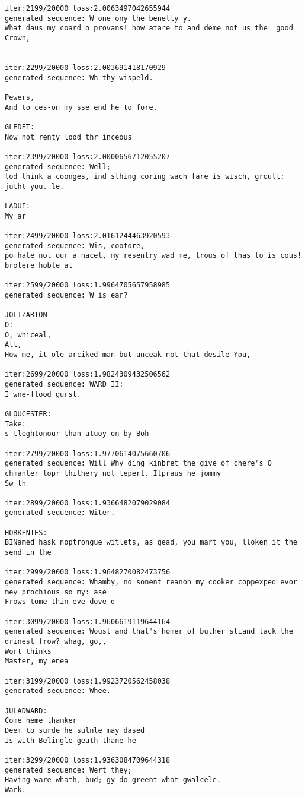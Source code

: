 \documentclass[11pt]{article}
\begin{document}
\begin{Verbatim}[commandchars=\\\{\}]
iter:2199/20000 loss:2.0063497042655944
generated sequence: W one ony the benelly y.
What daus my coard o provans! how atare to and deme not us the 'good
Crown,


iter:2299/20000 loss:2.003691418170929
generated sequence: Wh thy wispeld.

Pewers,
And to ces-on my sse end he to fore.

GLEDET:
Now not renty lood thr inceous

iter:2399/20000 loss:2.0000656712055207
generated sequence: Well;
lod think a coonges, ind sthing coring wach fare is wisch, groull:
jutht you. le.

LADUI:
My ar

iter:2499/20000 loss:2.0161244463920593
generated sequence: Wis, cootore,
po hate not our a nacel, my resentry wad me, trous of thas to is cous! brotere hoble at

iter:2599/20000 loss:1.9964705657958985
generated sequence: W is ear?

JOLIZARION
O:
O, whiceal,
All,
How me, it ole arciked man but unceak not that desile You, 

iter:2699/20000 loss:1.9824309432506562
generated sequence: WARD II:
I wne-flood gurst.

GLOUCESTER:
Take:
s tleghtonour than atuoy on by Boh

iter:2799/20000 loss:1.9770614075660706
generated sequence: Will Why ding kinbret the give of chere's O chmanter lopr thithery not lepert. Itpraus he jommy
Sw th

iter:2899/20000 loss:1.9366482079029084
generated sequence: Witer.

HORKENTES:
BINamed hask noptrongue witlets, as gead, you mart you, lloken it the send in the 

iter:2999/20000 loss:1.9648270082473756
generated sequence: Whamby, no sonent reanon my cooker coppexped evor mey prochious so my: ase
Frows tome thin eve dove d

iter:3099/20000 loss:1.9606619119644164
generated sequence: Woust and that's homer of buther stiand lack the drinest frow? whag, go,,
Wort thinks
Master, my enea

iter:3199/20000 loss:1.9923720562458038
generated sequence: Whee.

JULADWARD:
Come heme thamker
Deem to surde he sulnle may dased
Is with Belingle geath thane he

iter:3299/20000 loss:1.9363084709644318
generated sequence: Wert they;
Having ware whath, bud; gy do greent what gwalcele.
Wark.


\end{Verbatim}
\end{document}

